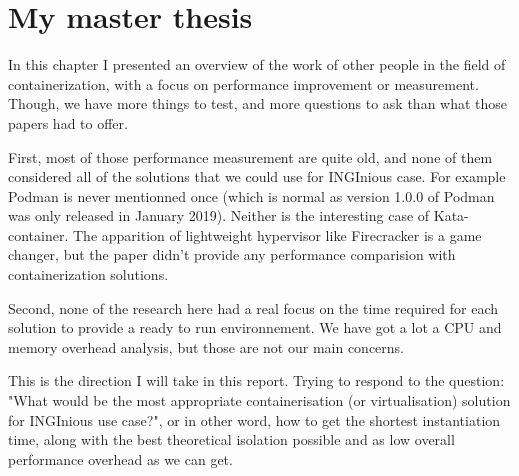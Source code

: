 \section{My master thesis}
In this chapter I presented an overview of the work of other people in the field of containerization, with a focus on performance improvement or measurement.  Though, we have more things to test, and more questions to ask than what those papers had to offer.

First, most of those performance measurement are quite old, and none of them considered all of the solutions that we could use for INGInious case.  For example Podman is never mentionned once (which is normal as version 1.0.0 of Podman was only released in January 2019).  Neither is the interesting case of Kata-container.  The apparition of lightweight hypervisor like Firecracker is a game changer, but the paper didn't provide any performance comparision with containerization solutions.

Second, none of the research here had a real focus on the time required for each solution to provide a ready to run environnement.  We have got a lot a CPU and memory overhead analysis, but those are not our main concerns.

This is the direction I will take in this report.  Trying to respond to the question: "What would be the most appropriate containerisation (or virtualisation) solution for INGInious use case?", or in other word, how to get the shortest instantiation time, along with the best theoretical isolation possible and as low overall performance overhead as we can get.
